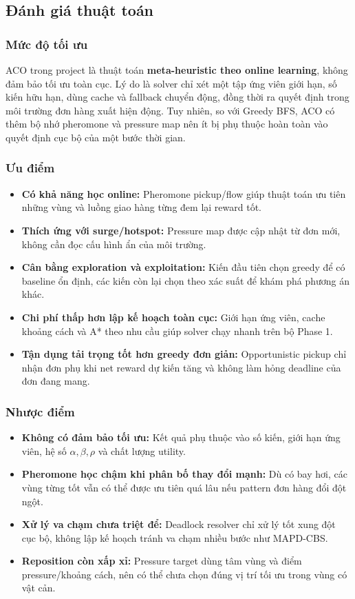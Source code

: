 \documentclass[conference]{IEEEtran}
\begin{document}
\subsection{Đánh giá thuật toán}
\subsubsection{Mức độ tối ưu}
ACO trong project là thuật toán \textbf{meta-heuristic theo online learning}, không đảm bảo tối ưu toàn cục. Lý do là solver chỉ xét một tập ứng viên giới hạn, số kiến hữu hạn, dùng cache và fallback chuyển động, đồng thời ra quyết định trong môi trường đơn hàng xuất hiện động. Tuy nhiên, so với Greedy BFS, ACO có thêm bộ nhớ pheromone và pressure map nên ít bị phụ thuộc hoàn toàn vào quyết định cục bộ của một bước thời gian.

\subsubsection{Ưu điểm}
\begin{itemize}
    \item \textbf{Có khả năng học online:} Pheromone pickup/flow giúp thuật toán ưu tiên những vùng và luồng giao hàng từng đem lại reward tốt.
    \item \textbf{Thích ứng với surge/hotspot:} Pressure map được cập nhật từ đơn mới, không cần đọc cấu hình ẩn của môi trường.
    \item \textbf{Cân bằng exploration và exploitation:} Kiến đầu tiên chọn greedy để có baseline ổn định, các kiến còn lại chọn theo xác suất để khám phá phương án khác.
    \item \textbf{Chi phí thấp hơn lập kế hoạch toàn cục:} Giới hạn ứng viên, cache khoảng cách và A* theo nhu cầu giúp solver chạy nhanh trên bộ Phase 1.
    \item \textbf{Tận dụng tải trọng tốt hơn greedy đơn giản:} Opportunistic pickup chỉ nhận đơn phụ khi net reward dự kiến tăng và không làm hỏng deadline của đơn đang mang.
\end{itemize}

\subsubsection{Nhược điểm}
\begin{itemize}
    \item \textbf{Không có đảm bảo tối ưu:} Kết quả phụ thuộc vào số kiến, giới hạn ứng viên, hệ số $\alpha,\beta,\rho$ và chất lượng utility.
    \item \textbf{Pheromone học chậm khi phân bố thay đổi mạnh:} Dù có bay hơi, các vùng từng tốt vẫn có thể được ưu tiên quá lâu nếu pattern đơn hàng đổi đột ngột.
    \item \textbf{Xử lý va chạm chưa triệt để:} Deadlock resolver chỉ xử lý tốt xung đột cục bộ, không lập kế hoạch tránh va chạm nhiều bước như MAPD-CBS.
    \item \textbf{Reposition còn xấp xỉ:} Pressure target dùng tâm vùng và điểm pressure/khoảng cách, nên có thể chưa chọn đúng vị trí tối ưu trong vùng có vật cản.
\end{itemize}
\end{document}
